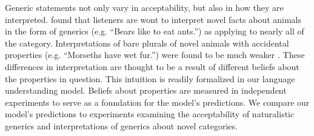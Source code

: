 \documentclass[10pt,letterpaper]{article}
\newcommand{\red}[1]{\textcolor{Red}{#1}}
\begin{document}
Generic statements not only vary in acceptability, but also in how they are interpreted.  found that listeners are wont to interpret novel facts about animals in the form of generics (e.g. ``Bears like to eat ants.'') as applying to nearly all of the category. Interpretations of bare plurals of novel animals with accidental properties (e.g. ``Morseths have wet fur.'') were found to be much weaker \cite{Cimpian2010}. These differences in interpretation are thought to be a result of different beliefs about the properties in question. This intuition is readily formalized in our language understanding model. Beliefs about properties are measured in independent experiments to serve as a foundation for the model's predictions. 
We compare our model's predictions to experiments examining the acceptability of naturalistic generics and interpretations of generics about novel categories.

\end{document}
